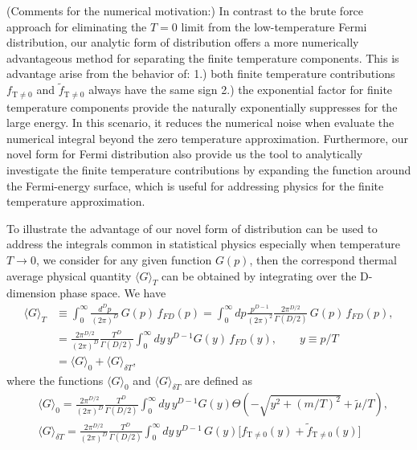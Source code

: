 \documentclass[sn-mathphys,Numbered]{sn-jnl}
\newcommand*{\xred}{\color{red}}
\begin{document}
{\xred(Comments for the numerical motivation:) In contrast to the brute force approach for eliminating the $T=0$ limit from the low-temperature Fermi distribution, our analytic form of distribution offers a more numerically advantageous method for separating the finite temperature components. This is advantage arise from the behavior of: 1.) both finite temperature contributions $f_\mathrm{T\neq0}$ and $\tilde f_\mathrm{T\neq0}$ always have the same sign 2.) the exponential factor for finite temperature components provide the naturally exponentially suppresses for the large energy. In this scenario, it reduces the numerical noise when evaluate the numerical integral beyond the zero temperature approximation. Furthermore, our novel form for Fermi distribution also provide us the tool to analytically investigate the finite temperature contributions by expanding the function around the Fermi-energy surface, which is useful for addressing physics for the finite temperature approximation.}

To illustrate the advantage of our novel form of distribution can be used to address the integrals common in statistical physics especially when temperature $T\to0$, we consider for any given function $G(p)$, then the correspond  thermal average physical quantity $\langle G\rangle_T$ can be obtained by integrating over the D-dimension phase space. We have
\begin{align}
\langle G\rangle_T&\equiv\int^{\infty}_{0}\!\!\frac{d^Dp}{(2\pi)^D}\,G(p)\,f_{FD}(p)=\int^{\infty}_{0}\!\!dp\frac{p^{D-1}}{(2\pi)^2}\frac{2\pi^{D/2}}{\Gamma(D/2)}\,G(p)\,f_{FD}(p),\\
&=\frac{2\pi^{D/2}}{(2\pi)^D}\frac{T^D}{\Gamma(D/2)}\int^\infty_0dy\,y^{D-1}G(y)\,f_{FD}(y),\qquad y\equiv{p}/{T}\\
&=\langle G\rangle_{0}+\langle G\rangle_{\delta T},
\end{align}
 where the functions $\langle G\rangle_{0}$ and $\langle G\rangle_{\delta T}$ are defined as
\begin{align}
&\langle G\rangle_{0}=\frac{2\pi^{D/2}}{(2\pi)^D}\frac{T^D}{\Gamma(D/2)}\int^{\infty}_{0}\!\!dy\,y^{D-1}G(y)\Theta(-\sqrt{y^2+(m/T)^2}+\tilde\mu/T),\\
\label{G_deltaT}
&\langle G\rangle_{\delta T}=\frac{2\pi^{D/2}}{(2\pi)^D}\frac{T^D}{\Gamma(D/2)}\int^{\infty}_{0}\!\!dy\,y^{D-1}\,G(y)\bigg[f_\mathrm{T\neq0}(y)+\tilde f_\mathrm{T\neq0}(y)\bigg]
\end{align}
\end{document}

